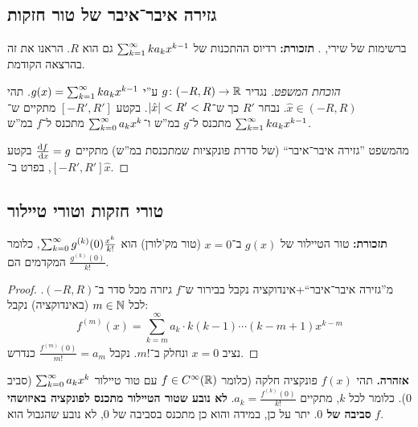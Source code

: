 \documentclass[]{../../../../tex/classes/styledArticle}
\begin{document}
	\subsection*{גזירה איבר־איבר של טור חזקות}
	ברשימות של שירי, . 
	\textbf{תזכורת: }רדיוס ההתכנות של $\sum_{k = 1}^{\infty} ka_kx^{k -1}$ גם הוא $R$. הראנו את זה בהרצאה הקודמת. 
	\begin{proof}[הוכחת המשפט]
		נגדיר $g \colon (-R, R) \to \mathbb{R}$ ע''י $g(x) =\sum_{k = 1}^{\infty} ka_kx^{k -1}$. תהי $\hat x \in (-R, R)$. נבחר $R'$ כך ש־$\left \lvert \hat x \right \rvert < R' < R$. בקטע $[-R', R']$ מתקיים ש־$\sum_{k = 1}^{\infty}  ka_kx^{k -1}$ מתכנס ל־$g$ במ''ש ו־$\sum_{k = 0}^{\infty} a_kx^{k}$ מתכנס ל־$f$ במ''ש. 
		
		מהמשפט ''גזירה איבר־איבר`` (של סדרת פונקציות שמתכנסת במ''ש) מתקיים $\frac{\mathrm{d} f}{\,\mathrm{d}x} = g$ בקטע $[-R', R']$, בפרט ב־$\hat x$. 
	\end{proof}
	
	\subsection*{טורי חזקות וטורי טיילור}
	\textbf{תזכורת: }טור הטיילור של $g(x)$ ב־$x =0$ (טור מק'לורן) הוא $\sum_{k = 0}^{\infty} g^{(k)}(0) \frac{x^{k}}{k!}$, כלומר המקדמים הם $\frac{g^{(k)}(0)}{k!}$. 
	\begin{proof}
		מ''גזירה איבר־איבר``+אינדוקציה נקבל בבירור ש־$f$ גיזרה מכל סדר ב־$(-R, R)$. לכל $m \in \mathbb{N}$ (באינדוקציה) נקבל: 
		\[ f^{(m)}(x) = \sum_{k = m}^{\infty} a_k \cdot k(k -1)\cdots (k - m + 1)x^{k - m} \]
		נציב $x = 0$ ונחלק ב־$m!$. נקבל $\frac{f^{(m)}(0)}{m!} = a_m$ כנדרש. 
	\end{proof}
	\color{red}\textbf{אזהרה. }\color{black}תהי $f(x)$ פונקציה חלקה (כלומר $f \in C^{\infty}(\mathbb{R})$ עם טור טיילור $\sum_{k = 0}^{\infty} a_kx^{k}$ (סביב $0$). כלומר לכל $k$, מתקיים $a_k = \frac{f^{(k)}(0)}{k!}$. \textbf{לא נובע שטור הטיילור מתכנס לפונקציה באיזושהי סביבה של $0$}. יתר על כן, במידה והוא כן מתכנס בסביבה של $0$, לא נובע שהגבול הוא $f$. 
	
\end{document}
